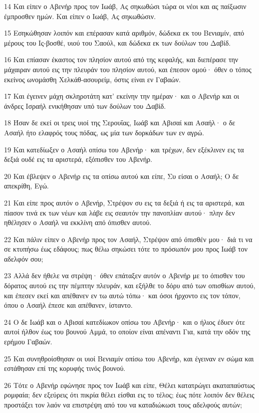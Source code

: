 \par 14 Και είπεν ο Αβενήρ προς τον Ιωάβ, Ας σηκωθώσι τώρα οι νέοι και ας παίξωσιν έμπροσθεν ημών. Και είπεν ο Ιωάβ, Ας σηκωθώσιν.
\par 15 Εσηκώθησαν λοιπόν και επέρασαν κατά αριθμόν, δώδεκα εκ του Βενιαμίν, από μέρους του Ις-βοσθέ, υιού του Σαούλ, και δώδεκα εκ των δούλων του Δαβίδ.
\par 16 Και επίασαν έκαστος τον πλησίον αυτού από της κεφαλής, και διεπέρασε την μάχαιραν αυτού εις την πλευράν του πλησίον αυτού, και έπεσον ομού· όθεν ο τόπος εκείνος ωνομάσθη Χελκάθ-ασουρείμ, όστις είναι εν Γαβαών.
\par 17 Και έγεινεν μάχη σκληροτάτη κατ' εκείνην την ημέραν· και ο Αβενήρ και οι άνδρες Ισραήλ ενικήθησαν υπό των δούλων του Δαβίδ.
\par 18 Ήσαν δε εκεί οι τρεις υιοί της Σερουΐας, Ιωάβ και Αβισαί και Ασαήλ· ο δε Ασαήλ ήτο ελαφρός τους πόδας, ως μία των δορκάδων των εν αγρώ.
\par 19 Και κατεδίωξεν ο Ασαήλ οπίσω του Αβενήρ· και τρέχων, δεν εξέκλινεν εις τα δεξιά ουδέ εις τα αριστερά, εξόπισθεν του Αβενήρ.
\par 20 Και έβλεψεν ο Αβενήρ εις τα οπίσω αυτού και είπε, Συ είσαι ο Ασαήλ; Ο δε απεκρίθη, Εγώ.
\par 21 Και είπε προς αυτόν ο Αβενήρ, Στρέψον συ εις τα δεξιά ή εις τα αριστερά, και πίασον τινά εκ των νέων και λάβε εις σεαυτόν την πανοπλίαν αυτού· πλην δεν ηθέλησεν ο Ασαήλ να εκκλίνη από όπισθεν αυτού.
\par 22 Και πάλιν είπεν ο Αβενήρ προς τον Ασαήλ, Στρέψον από όπισθέν μου· διά τι να σε κτυπήσω έως εδάφους; πως θέλω σηκώσει τότε το πρόσωπόν μου προς Ιωάβ τον αδελφόν σου;
\par 23 Αλλά δεν ήθελε να στρέψη· όθεν επάταξεν αυτόν ο Αβενήρ με το όπισθεν του δόρατος αυτού εις την πέμπτην πλευράν, και εξήλθε το δόρυ από των οπισθίων αυτού, και έπεσεν εκεί και απέθανεν εν τω αυτώ τόπω· και όσοι ήρχοντο εις τον τόπον, όπου ο Ασαήλ έπεσε και απέθανεν, ίσταντο.
\par 24 Ο δε Ιωάβ και ο Αβισαί κατεδίωκον οπίσω του Αβενήρ· και ο ήλιος έδυεν ότε αυτοί ήλθον έως του βουνού Αμμά, το οποίον είναι απέναντι Για, κατά την οδόν της ερήμου Γαβαών.
\par 25 Και συνηθροίσθησαν οι υιοί Βενιαμίν οπίσω του Αβενήρ, και έγειναν εν σώμα και εστάθησαν επί της κορυφής τινός βουνού.
\par 26 Τότε ο Αβενήρ εφώνησε προς τον Ιωάβ και είπε, Θέλει κατατρώγει ακαταπαύστως ρομφαία; δεν εξεύρεις ότι πικρία θέλει είσθαι εις το τέλος; έως πότε λοιπόν δεν θέλεις προστάξει τον λαόν να επιστρέψη από του να καταδιώκωσι τους αδελφούς αυτών;

